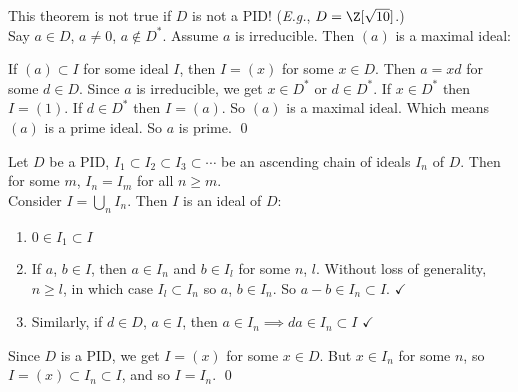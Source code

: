 \note This theorem is not true if $D$ is not a PID!  (\emph{E.g.}, $D=\Z[\sqrt{10}]$.) \\
\pf Say $a\in D$, $a\neq0$, $a\notin D^*$.  Assume $a$ is irreducible.  Then $(a)$ is a maximal ideal: \par
If $(a)\subset I$ for some ideal $I$, then $I=(x)$ for some $x\in D$.  Then $a=xd$ for some $d\in D$.  Since $a$ is irreducible, we get $x\in D^*$ or $d\in D^*$.
If $x\in D^*$ then $I=(1)$.
If $d\in D^*$ then $I=(a)$.
So $(a)$ is a maximal ideal.  Which means $(a)$ is a prime ideal.  So $a$ is prime. \qed

\thm Let $D$ be a PID,
$I_1\subset I_2\subset I_3\subset\dotsb$ be an ascending chain of ideals $I_n$ of $D$.  Then for some $m$, $I_n=I_m$ for all $n\geq m$. \\
\pf Consider $I=\bigcup_n I_n$.  Then $I$ is an ideal of $D$:
\begin{enumerate}[label=(\arabic*)]
\item $0\in I_1\subset I$
\item If $a$, $b\in I$, then $a\in I_n$ and $b\in I_l$ for some $n$, $l$.  Without loss of generality, $n\geq l$, in which case $I_l\subset I_n$ so $a$, $b\in I_n$.  So $a-b\in I_n\subset I$. $\checkmark$
\item Similarly, if $d\in D$, $a\in I$, then $a\in I_n\implies da\in I_n\subset I$ $\checkmark$
\end{enumerate}
Since $D$ is a PID, we get $I=(x)$ for some $x\in D$.  But $x\in I_n$ for some $n$, so $I=(x)\subset I_n\subset I$, and so $I=I_n$. \qed
